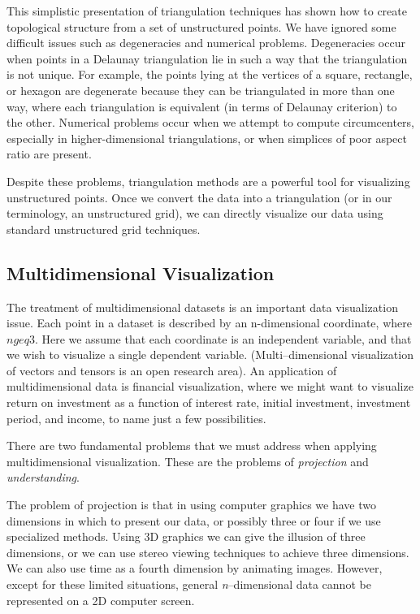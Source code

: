 This simplistic presentation of triangulation techniques has shown how to create topological structure from a set of unstructured points. We have ignored some difficult issues such as degeneracies and numerical problems. Degeneracies occur when points in a Delaunay triangulation lie in such a way that the triangulation is not unique. For example, the points lying at the vertices of a square, rectangle, or hexagon are degenerate because they can be triangulated in more than one way, where each triangulation is equivalent (in terms of Delaunay criterion) to the other. Numerical problems occur when we attempt to compute circumcenters, especially in higher-dimensional triangulations, or when simplices of poor aspect ratio are present.

Despite these problems, triangulation methods are a powerful tool for visualizing unstructured points. Once we convert the data into a triangulation (or in our terminology, an unstructured grid), we can directly visualize our data using standard unstructured grid techniques.

\subsection{Multidimensional Visualization}

The treatment of multidimensional datasets is an important data visualization issue. Each point in a dataset is described by an n-dimensional coordinate, where $n geq 3$. Here we assume that each coordinate is an independent variable, and that we wish to visualize a single dependent variable. (Multi--dimensional visualization of vectors and tensors is an open research area). An application of multidimensional data is financial visualization, where we might want to visualize return on investment as a function of interest rate, initial investment, investment period, and income, to name just a few possibilities.

There are two fundamental problems that we must address when applying multidimensional visualization. These are the problems of \emph{projection} and \emph{understanding}.

The problem of projection is that in using computer graphics we have two dimensions in which to present our data, or possibly three or four if we use specialized methods. Using 3D graphics we can give the illusion of three dimensions, or we can use stereo viewing techniques to achieve three dimensions. We can also use time as a fourth dimension by animating images. However, except for these limited situations, general \emph{n}--dimensional data cannot be represented on a 2D computer screen.

